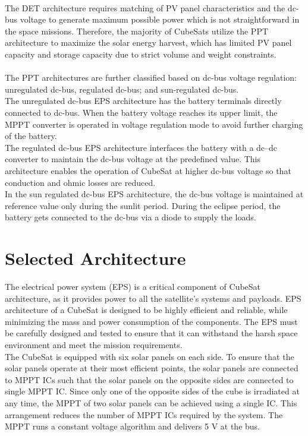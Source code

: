  \\ 
The DET architecture requires matching of PV panel characteristics and the dc-bus voltage to generate maximum possible power which is not straightforward in the space missions. Therefore, the majority of CubeSats utilize the PPT architecture to maximize the solar energy harvest, which has limited PV panel capacity and storage capacity due to strict volume and weight constraints. 
\\ \\
The PPT architectures are further classified based on dc-bus voltage regulation: unregulated dc-bus, regulated dc-bus; and sun-regulated dc-bus. 
\\
The unregulated dc-bus EPS architecture has the battery terminals directly connected to dc-bus. When the battery voltage reaches its upper limit, the MPPT converter is operated in voltage regulation mode to avoid further charging of the battery. 
\\ 
The regulated dc-bus EPS architecture interfaces the battery with a dc–dc converter to maintain the dc-bus voltage at the predefined value. This architecture enables the operation of CubeSat at higher dc-bus voltage so that conduction and ohmic losses are reduced. 
\\
In the sun regulated dc-bus EPS architecture, the dc-bus voltage is maintained at reference value only during the sunlit period. During the eclipse period, the battery gets connected to the dc-bus via a diode to supply the loads.

\section[Selected Architecture]{Selected Architecture}



The electrical power system (EPS) is a critical component of CubeSat architecture, as it provides power to all the satellite's systems and payloads. EPS architecture of a CubeSat is designed to be highly efficient and reliable, while minimizing the mass and power consumption of the components. The EPS must be carefully designed and tested to ensure that it can withstand the harsh space environment and meet the mission requirements.\\

The CubeSat is equipped with six solar panels on each side. To ensure that the solar panels operate at their most efficient points, the solar panels are connected to MPPT ICs such that the solar panels on the opposite sides are connected to single MPPT IC. Since only one of the opposite sides of the cube is irradiated at any time, the MPPT of two solar panels can be achieved using a single IC. This arrangement reduces the number of MPPT ICs required by the system. The MPPT runs a constant voltage algorithm and delivers 5 V at the bus. 
\\

